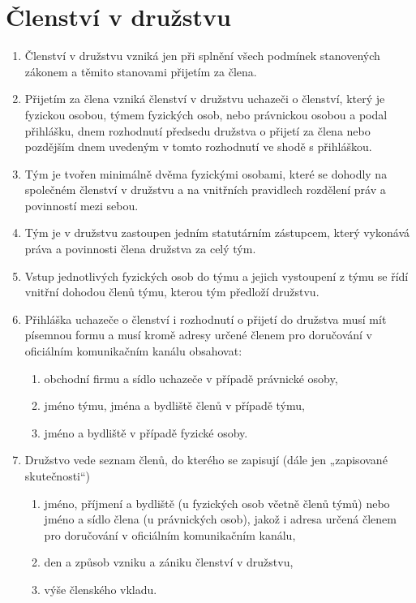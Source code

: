 \section{Členství v družstvu}
\begin{enumerate}
    \item Členství v družstvu vzniká jen při splnění všech podmínek stanovených zákonem a těmito stanovami přijetím za člena.
    \item Přijetím za člena vzniká členství v družstvu uchazeči o členství, který je fyzickou osobou, týmem fyzických osob, nebo právnickou osobou a podal přihlášku, dnem rozhodnutí předsedu družstva o přijetí za člena nebo pozdějším dnem uvedeným v tomto rozhodnutí ve shodě s přihláškou.
    \item Tým je tvořen minimálně dvěma fyzickými osobami, které se dohodly na společném členství v družstvu a na vnitřních pravidlech rozdělení práv a povinností mezi sebou.
    \item Tým je v družstvu zastoupen jedním statutárním zástupcem, který vykonává práva a povinnosti člena družstva za celý tým.
    \item Vstup jednotlivých fyzických osob do týmu a jejich vystoupení z týmu se řídí vnitřní dohodou členů týmu, kterou tým předloží družstvu.
    \item Přihláška uchazeče o členství i rozhodnutí o přijetí do družstva musí mít písemnou formu a musí kromě adresy určené členem pro doručování v oficiálním komunikačním kanálu obsahovat:
    \begin{enumerate}[label=\alph*.]
        \item obchodní firmu a sídlo uchazeče v případě právnické osoby,
        \item jméno týmu, jména a bydliště členů v případě týmu,
        \item jméno a bydliště v případě fyzické osoby.
    \end{enumerate}
    \item Družstvo vede seznam členů, do kterého se zapisují (dále jen „zapisované skutečnosti“)
    \begin{enumerate}[label=\alph*.]
        \item jméno, příjmení a bydliště (u fyzických osob včetně členů týmů) nebo jméno a sídlo člena (u právnických osob), jakož i adresa určená členem pro doručování v oficiálním komunikačním kanálu,
        \item den a způsob vzniku a zániku členství v družstvu,
        \item výše členského vkladu.

\end{enumerate}
\end{enumerate}
